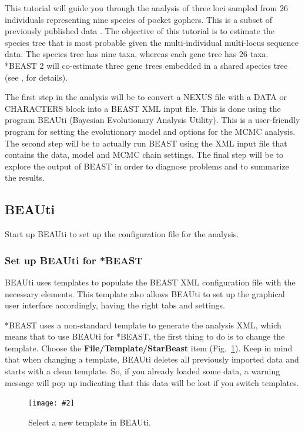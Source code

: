 \documentclass{article}
\newcommand{\includeimage}[2][]{%
\texttt{[image: \#2]}
}
\begin{document}
This tutorial will guide you through the analysis of three loci sampled from 26 individuals representing nine species of pocket gophers. This is a subset of previously published data \cite{belfiore2008multilocus}. The objective of this tutorial is to estimate the species tree that is most probable given the multi-individual multi-locus sequence data. The species tree has nine taxa, whereas each gene tree has 26 taxa. *BEAST 2 will co-estimate three gene trees embedded in a shared species tree (see \cite{Heled:2010fk}, for details).

The first step in the analysis will be to convert a NEXUS file with a DATA or CHARACTERS block into a BEAST XML input file. This is done using the program BEAUti (Bayesian Evolutionary Analysis Utility). This is a user-friendly program for setting the evolutionary model and options for the MCMC analysis. The second step will be to actually run BEAST using the XML input file that contains the data, model and MCMC chain settings. The final step will be to explore the output of BEAST in order to diagnose problems and to summarize the results.

\subsection{BEAUti}

Start up BEAUti to set up the configuration file for the analysis.

\subsubsection{Set up BEAUti for *BEAST}

BEAUti uses templates to populate the BEAST XML configuration file with the necessary elements. This template also allows BEAUti to set up the graphical user interface accordingly, having the right tabs and settings.

*BEAST uses a non-standard template to generate the analysis XML, which means that to use BEAUti for *BEAST, the first thing to do is to change the template. Choose the {\bf File/Template/StarBeast} item (Fig.~\ref{fig.template}). Keep in mind that when changing a template, BEAUti deletes all previously imported data and starts with a clean template. So, if you already loaded some data, a warning message will pop up indicating that this data will be lost if you switch templates.

\begin{figure}[h]
\centering
\includeimage[scale=0.4,clip=true,trim=0 550 200 0]{figures/BEAUti_selectTemplate}
\caption{\label{fig.template} Select a new template in BEAUti.}
\end{figure}
\end{document}
